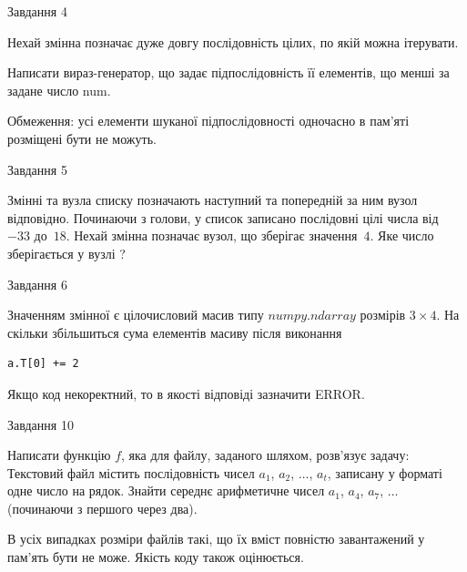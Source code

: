 \documentclass[12pt, ukrainian]{article}
\begin{document}
{               
{\begin{center}Завдання {4}\end{center}}
\vspace{-6mm}
Нехай змінна  позначає дуже довгу послідовність цілих, по якій можна ітерувати.

Написати вираз-генератор, що задає підпослідовність її елементів, що менші за задане число num.

Обмеження: усі елементи шуканої підпослідовності одночасно в пам'яті розміщені бути не можуть.\par

\vspace{10mm}
               
{\begin{center}Завдання {5}\end{center}}
\vspace{-6mm}
Змінні  та  вузла списку позначають наступний та попередній за ним вузол відповідно. Починаючи з голови, у список записано послідовні цілі числа від~$-33$ до~$18$. Нехай змінна  позначає вузол, що зберігає значення~$4$.
Яке число зберігається у вузлі  ?\par

               
{\begin{center}Завдання {6}\end{center}}
\vspace{-6mm}
Значенням змінної  є цілочисловий масив типу $numpy.ndarray$ розмірів $3{\times}4$. На скільки збільшиться сума елементів масиву  після виконання
\begin{verbatim}
a.T[0] += 2
\end{verbatim}


Якщо код некоректний, то в якості відповіді зазначити ERROR.\par

               
{\begin{center}Завдання {10}\end{center}}
\vspace{-6mm}

Написати функцію $f$, яка для файлу, заданого шляхом, розв’язує задачу:\\ Текстовий файл містить послідовність чисел $a_1$, $a_2$, $\ldots$, $a_t$, записану у форматі одне число на рядок. Знайти середнє арифметичне чисел $a_1$, $a_4$, $a_7$, $\ldots$ (починаючи з першого через два).

В усіх випадках розміри файлів такі, що їх вміст повністю завантажений у пам'ять бути не може. Якість коду також оцінюється.



}
\end{document}
